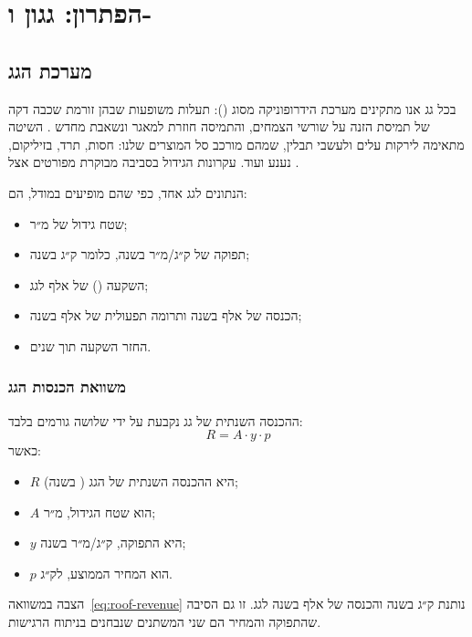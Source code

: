 \chapter{הפתרון: גגון ו-}\label{ch:solution}

\section{מערכת הגג}
בכל גג אנו מתקינים מערכת הידרופוניקה מסוג  (): תעלות משופעות שבהן זורמת שכבה דקה של תמיסת הזנה על שורשי הצמחים, והתמיסה חוזרת למאגר ונשאבת מחדש \cite{resh2012}. השיטה מתאימה לירקות עלים ולעשבי תבלין, שמהם מורכב סל המוצרים שלנו: חסות, תרד, בזיליקום, נענע ועוד. עקרונות הגידול בסביבה מבוקרת מפורטים אצל \cite{kozai2020}.

הנתונים לגג אחד, כפי שהם מופיעים במודל, הם:
\begin{itemize}
  \item שטח גידול של \RRarea{} מ״ר;
  \item תפוקה של \RRyield{} ק״ג/מ״ר בשנה, כלומר \RRroofKg{} ק״ג בשנה;
  \item השקעה () של \RRcapexRoof{} אלף \shekel{} לגג;
  \item הכנסה של \RRroofRevenue{} אלף \shekel{} בשנה ותרומה תפעולית של \RRroofContribution{} אלף \shekel{} בשנה;
  \item החזר השקעה תוך \RRroofPayback{} שנים.
\end{itemize}

\subsection{משוואת הכנסות הגג}
ההכנסה השנתית של גג נקבעת על ידי שלושה גורמים בלבד:
\begin{equation}\label{eq:roof-revenue}
  R = A \cdot y \cdot p
\end{equation}
כאשר:
\begin{itemize}
  \item $R$ היא ההכנסה השנתית של הגג (\shekel{} בשנה);
  \item $A$ הוא שטח הגידול, \RRarea{} מ״ר;
  \item $y$ היא התפוקה, \RRyield{} ק״ג/מ״ר בשנה;
  \item $p$ הוא המחיר הממוצע, \RRprice{} \shekel{} לק״ג.
\end{itemize}
הצבה במשוואה~\eqref{eq:roof-revenue} נותנת \RRroofKg{} ק״ג בשנה והכנסה של \RRroofRevenue{} אלף \shekel{} בשנה לגג. זו גם הסיבה שהתפוקה והמחיר הם שני המשתנים שנבחנים בניתוח הרגישות.

